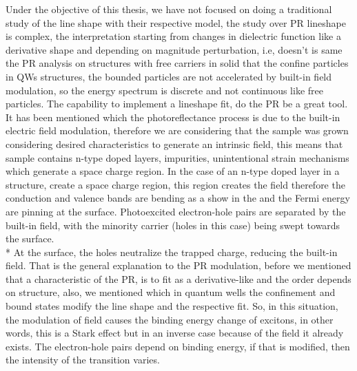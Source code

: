 Under the objective of this thesis, we have not focused on doing a traditional study of the line shape with their respective model, the study over PR lineshape is complex, the interpretation starting from changes in dielectric function like a derivative shape and depending on magnitude perturbation, i.e, doesn't is same the  PR analysis on structures with free carriers in solid that the confine particles in QWs structures, the bounded particles are not accelerated by built-in field modulation, so the energy spectrum is discrete and not continuous like free particles.  The capability to implement a lineshape fit,  do the PR be a great tool. 
It has been mentioned which the photoreflectance process is due to the built-in electric field modulation, therefore we are considering that the sample was grown considering desired characteristics to generate an intrinsic field, this means that sample contains n-type doped layers, impurities, unintentional strain mechanisms which generate a space charge region. In the case of an n-type doped layer in a structure, create a space charge region, this region creates the field therefore the conduction and valence bands are bending as a show in the  and the Fermi energy are pinning at the surface. Photoexcited electron-hole pairs are separated by the built-in field, with the
minority carrier (holes in this case) being swept towards the surface.\\*
At the surface, the holes neutralize the trapped charge, reducing the built-in field\cite{misiewicz1999photoreflectance}. That is the general explanation to the PR modulation, before we mentioned that a characteristic of the PR, is to fit as a derivative-like and the order depends on structure, also, we mentioned which in quantum wells the confinement and bound states modify the line shape and the respective fit. So, in this situation, the modulation of field causes the binding energy change of excitons, in other words, this is a Stark effect but in an inverse case because of the field it already exists. The electron-hole pairs depend on binding energy,  if that is modified, then the intensity of the transition varies.  




